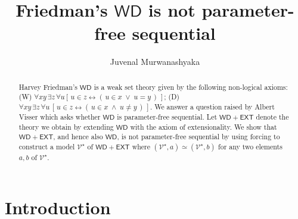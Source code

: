 \documentclass[10pt,a4paper, openany,  oldfontcommands]{memoir}
\title{Friedman's  $  \mathsf{WD} $  is not parameter-free sequential}
\author{Juvenal Murwanashyaka}
\affil{Institute of Mathematics,  Czech Academy of Sciences,   Czech Republic}
\newtheorem{open problem} [theorem] {Open Problem}
\begin{document}
\maketitle 
 
\begin{abstract}
Harvey Friedman's $  \mathsf{WD} $  is  a  weak set  theory  given by the following  non-logical  axioms:
\textsf{(W)}   $  \forall x y   \,  \exists z  \,    \forall u   \left[    \,   u  \in z  \leftrightarrow   (    \,    u \in x   \;  \vee   \;    u  =  y     \,    )      \,      \right]    $; 
\textsf{(D)}  $   \forall x y   \,  \exists z  \,    \forall u   \,   \left[    \,    u  \in z  \leftrightarrow   (    \,    u \in x   \;  \wedge   \;    u  \neq  y     \,    )      \,       \right]    $. 
We answer   a   question  raised  by Albert Visser which  asks whether  $  \mathsf{WD} $  is  parameter-free sequential. 
Let  $  \mathsf{WD} +  \mathsf{EXT} $ denote the theory we obtain by extending  $  \mathsf{WD} $ with  the axiom of extensionality. 
We show that   $   \mathsf{WD} +  \mathsf{EXT}  $, and hence also  $   \mathsf{WD} $, 
  is not parameter-free sequential by using forcing  to  construct a model $    \mathcal{V}^{  \star }  $   of $     \mathsf{WD} +  \mathsf{EXT}   $      where 
$  \left(   \mathcal{V}^{  \star }  ,  a   \right)   \simeq   \left(   \mathcal{V}^{  \star }  ,   b   \right)    $  
 for any two elements  $a, b $  of  $  \mathcal{V}^{  \star }  $. 
\end{abstract}











\section{Introduction  }
\end{document}
